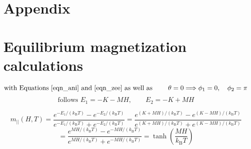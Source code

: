 \documentclass[12pt, DIV=12]{scrartcl}
\begin{document}
\newpage
\appendix
\section*{Appendix}
\section{Equilibrium magnetization calculations}
\label{app:theta_zero}
\[
    \text{with Equations \ref{eqn_ani} and \ref{eqn_zee} as well as }\qquad \theta=0\Longrightarrow\phi_1=0,\quad\phi_2=\pi
\]
\[
    \text{follows } E_1=-K-MH,\qquad E_2=-K+MH
\]

\[
    m_{||}(H,T)=\frac{e^{-E_1/(k_{\mathrm B}T)}-e^{-E_2/(k_{\mathrm B}T)}}{e^{-E_1/(k_{\mathrm B}T)}+e^{-E_2/(k_{\mathrm B}T)}}
    =\frac{e^{(K+MH)/(k_{\mathrm B}T)}-e^{(K-MH)/(k_{\mathrm B}T)}}{e^{(K+MH)/(k_{\mathrm B}T)}+e^{(K-MH)/(k_{\mathrm B}T)}}
\]
\[
    =\frac{e^{MH/(k_{\mathrm B}T)}-e^{-MH/(k_{\mathrm B}T)}}{e^{MH/(k_{\mathrm B}T)}+e^{-MH/(k_{\mathrm B}T)}}
    =\boxed{\tanh\!\left(\frac{MH}{k_{\mathrm B}T}\right)}
\]

\newpage



\end{document}
